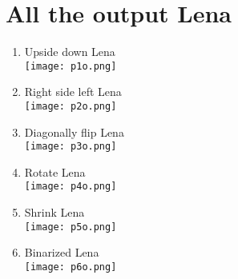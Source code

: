 \documentclass[12pt,a4paper]{article}
\begin{document}
\section*{All the output Lena}
\begin{enumerate}[label=(\alph*)]
	\item Upside down Lena\\ \texttt{[image: p1o.png]}
	\item Right side left Lena\\ \texttt{[image: p2o.png]}
	\item Diagonally flip Lena\\ \texttt{[image: p3o.png]}
	\item Rotate Lena\\ \texttt{[image: p4o.png]}
	\item Shrink Lena\\ \texttt{[image: p5o.png]}
	\item Binarized Lena\\ \texttt{[image: p6o.png]}
\end{enumerate}
\end{document}
